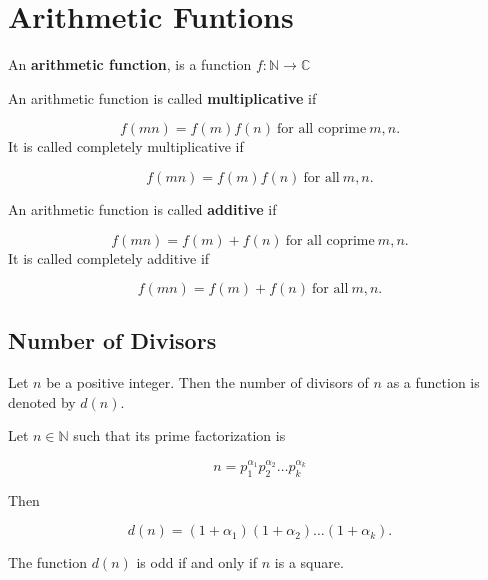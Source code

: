 \chapter{Arithmetic Funtions}

\begin{definition}
    An \textbf{arithmetic function}, is a function $f: \mathbb{N} \rightarrow \mathbb{C}$
\end{definition}

\begin{definition}
    An arithmetic function is called \textbf{multiplicative} if

    \[f(mn) = f(m)f(n) \ \text{for all coprime} \ m, n.\]
It is called completely multiplicative if

\[f(mn) = f(m)f(n) \ \text{for all} \ m, n.\]
\end{definition}

\begin{definition}
    An arithmetic function is called \textbf{additive} if

    \[f(mn) = f(m)+f(n) \ \text{for all coprime} \ m, n.\]
It is called completely additive if

\[f(mn) = f(m)+f(n) \ \text{for all} \ m, n.\]
\end{definition}

\section{Number of Divisors}

\begin{definition}
Let $n$ be a positive integer. Then the number of divisors of $n$ as a function
is denoted by $d(n)$.    
\end{definition}

\begin{theorem} Let $n \in \mathbb{N}$ such that its prime factorization is

    \[n = p_1^{\alpha_1}p_2^{\alpha_2} \dots p_k^{\alpha_k}\]

Then

    \[d(n) = (1 + \alpha_1)(1 + \alpha_2) \dots (1 + \alpha_k).\]
    
\end{theorem}

\begin{theorem}
    The function $d(n)$ is odd if and only if $n$ is a square.
\end{theorem}

